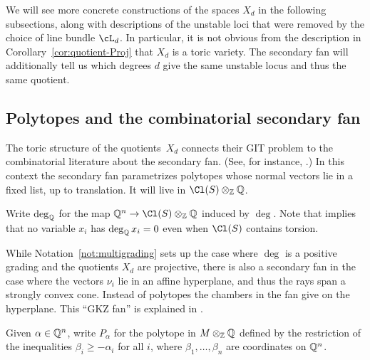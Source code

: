 \documentclass{article}
\begin{document}
We will see more concrete constructions of the spaces $X_d$ in the following subsections, along with descriptions of the unstable loci that were removed by the choice of line bundle $\cL_d$.  In particular, it is not obvious from the description in Corollary~\ref{cor:quotient-Proj} that $X_d$ is a toric variety.  The secondary fan will additionally tell us which degrees $d$ give the same unstable locus and thus the same quotient.

\subsection{Polytopes and the combinatorial secondary fan}\label{sec:polytope-fan}
The toric structure of the quotients~$X_d$ connects their GIT problem to the combinatorial literature about the secondary fan.  (See, for instance, \cite{OP91}.)  In this context the secondary fan parametrizes polytopes whose normal vectors lie in a fixed list, up to translation.  It will live in $\Cl(S)\otimes_\ZZ\QQ$.

Write $\deg_\mathbb Q$ for the map $\QQ^n\to\Cl(S)\otimes_\ZZ\QQ$ induced by $\deg$.  Note that \cite[Proposition 4.2.6]{CLS2011} implies that no variable $x_i$ has $\deg_\mathbb Q x_i=0$ even when $\Cl(S)$ contains torsion.

\begin{rem}\label{rem:triangulations}
  While Notation~\ref{not:multigrading} sets up the case where $\deg$ is a positive grading and the quotients $X_d$ are projective, there is also a secondary fan in the case where the vectors $\nu_i$ lie in an affine hyperplane, and thus the rays span a strongly convex cone.  Instead of polytopes the chambers in the fan give  on the hyperplane.  This ``GKZ fan'' is explained in \cite[Chapter~7]{GKZ1994}.
\end{rem}

\begin{defn}\label{def:polytope-of-deg}
  Given $\alpha\in\mathbb Q^n$, write $P_\alpha$ for the polytope in $M\otimes_\mathbb Z\mathbb Q$ defined by the restriction of the inequalities $\beta_i\geq -\alpha_i$ for all $i$, where $\beta_1,\ldots,\beta_n$ are coordinates on $\mathbb Q^n$.
\end{defn}
\end{document}
